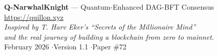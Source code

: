 \documentclass[11pt,a4paper]{article}
\begin{document}
\vspace{1cm}

\begin{center}
\end{center}

\vspace{1cm}

\begin{center}
\small\color{gray}
\textbf{Q-NarwhalKnight} --- Quantum-Enhanced DAG-BFT Consensus\\
\url{https://quillon.xyz}\\[0.3cm]
\textit{Inspired by T. Harv Eker's ``Secrets of the Millionaire Mind''}\\
\textit{and the real journey of building a blockchain from zero to mainnet.}\\[0.3cm]
February 2026 \quad$\cdot$\quad Version 1.1 \quad$\cdot$\quad Paper \#72
\end{center}
\end{document}
